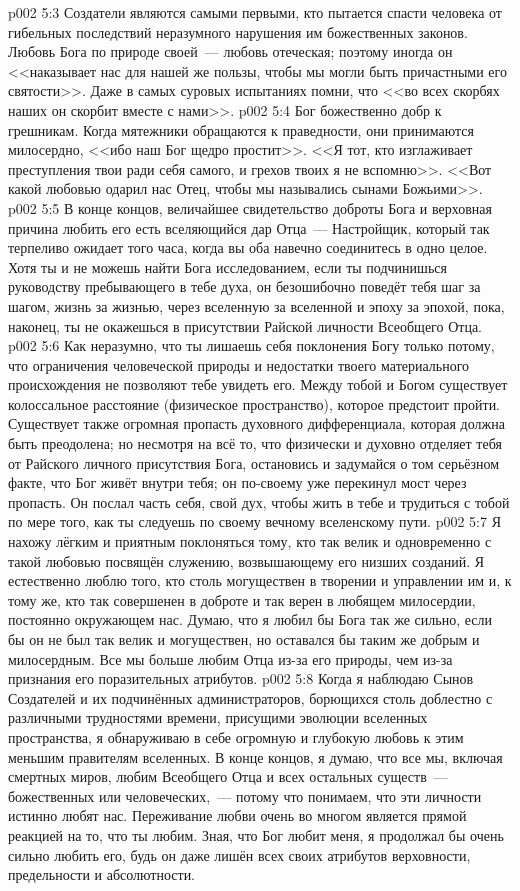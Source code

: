 \vs p002 5:3 Создатели являются самыми первыми, кто пытается спасти человека от гибельных последствий неразумного нарушения им божественных законов. Любовь Бога по природе своей~--- любовь отеческая; поэтому иногда он <<наказывает нас для нашей же пользы, чтобы мы могли быть причастными его святости>>. Даже в самых суровых испытаниях помни, что <<во всех скорбях наших он скорбит вместе с нами>>.
\vs p002 5:4 Бог божественно добр к грешникам. Когда мятежники обращаются к праведности, они принимаются милосердно, <<ибо наш Бог щедро простит>>. <<Я тот, кто изглаживает преступления твои ради себя самого, и грехов твоих я не вспомню>>. <<Вот какой любовью одарил нас Отец, чтобы мы назывались сынами Божьими>>.
\vs p002 5:5 В конце концов, величайшее свидетельство доброты Бога и верховная причина любить его есть вселяющийся дар Отца~--- Настройщик, который так терпеливо ожидает того часа, когда вы оба навечно соединитесь в одно целое. Хотя ты и не можешь найти Бога исследованием, если ты подчинишься руководству пребывающего в тебе духа, он безошибочно поведёт тебя шаг за шагом, жизнь за жизнью, через вселенную за вселенной и эпоху за эпохой, пока, наконец, ты не окажешься в присутствии Райской личности Всеобщего Отца.
\vs p002 5:6 \pc Как неразумно, что ты лишаешь себя поклонения Богу только потому, что ограничения человеческой природы и недостатки твоего материального происхождения не позволяют тебе увидеть его. Между тобой и Богом существует колоссальное расстояние (физическое пространство), которое предстоит пройти. Существует также огромная пропасть духовного дифференциала, которая должна быть преодолена; но несмотря на всё то, что физически и духовно отделяет тебя от Райского личного присутствия Бога, остановись и задумайся о том серьёзном факте, что Бог живёт внутри тебя; он по\hyp{}своему уже перекинул мост через пропасть. Он послал часть себя, свой дух, чтобы жить в тебе и трудиться с тобой по мере того, как ты следуешь по своему вечному вселенскому пути.
\vs p002 5:7 Я нахожу лёгким и приятным поклоняться тому, кто так велик и одновременно с такой любовью посвящён служению, возвышающему его низших созданий. Я естественно люблю того, кто столь могуществен в творении и управлении им и, к тому же, кто так совершенен в доброте и так верен в любящем милосердии, постоянно окружающем нас. Думаю, что я любил бы Бога так же сильно, если бы он не был так велик и могуществен, но оставался бы таким же добрым и милосердным. Все мы больше любим Отца из\hyp{}за его природы, чем из\hyp{}за признания его поразительных атрибутов.
\vs p002 5:8 Когда я наблюдаю Сынов Создателей и их подчинённых администраторов, борющихся столь доблестно с различными трудностями времени, присущими эволюции вселенных пространства, я обнаруживаю в себе огромную и глубокую любовь к этим меньшим правителям вселенных. В конце концов, я думаю, что все мы, включая смертных миров, любим Всеобщего Отца и всех остальных существ~--- божественных или человеческих,~--- потому что понимаем, что эти личности истинно любят нас. Переживание любви очень во многом является прямой реакцией на то, что ты любим. Зная, что Бог любит меня, я продолжал бы очень сильно любить его, будь он даже лишён всех своих атрибутов верховности, предельности и абсолютности.
